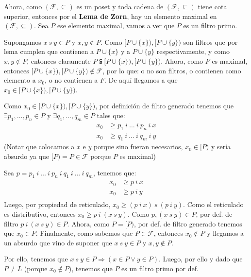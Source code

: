 \documentclass{article}
\begin{document}
Ahora, como $(\mathcal{F},\subseteq)$ es un poset y toda cadena de $(\mathcal{F},\subseteq)$ tiene cota superior, entonces por el \textbf{Lema de Zorn}, hay un elemento maximal en $(\mathcal{F},\subseteq)$. Sea $P$ ese elemento maximal, vamos a ver que $P$ es un filtro primo.

Supongamos $x\ s\ y\in P$ y $x,y\notin P$. Como $[P\cup\{x\}),[P\cup\{y\})$ son filtros que por lema cumplen que contienen a $P\cup\{x\}$ y a $P\cup\{y\}$ respectivamente, y como $x,y\notin P$, entonces claramente $P\subsetneqq [P\cup\{x\}),[P\cup\{y\})$. Ahora, como $P$ es maximal, entonces $[P\cup\{x\}),[P\cup\{y\})\notin\mathcal{F}$, por lo que: o no son filtros, o contienen como elemento a $x_0$, o no contienen a $F$. De aquí llegamos a que $x_0\in [P\cup\{x\}),[P\cup\{y\})$.

Como $x_0\in[P\cup\{x\}),[P\cup\{y\})$, por definición de filtro generado tenemos que $\exists p_1,\dots,p_n\in P$ y $\exists q_1,\dots,q_m\in P$ tales que:
\begin{equation*}
  \begin{aligned}
    x_0 & \geq p_1\ i\ \dots\ i\ p_n\ i\ x \\
    x_0 & \geq q_1\ i\ \dots\ i\ q_m\ i\ y
  \end{aligned}
\end{equation*}
(Notar que colocamos a $x$ e $y$ porque sino fueran necesarios, $x_0\in [P)$ y sería absurdo ya que $[P)=P\in\mathcal{F}$ porque $P$ es maximal)

Sea $p=p_1\ i\ \dots\ i\ p_n\ i\ q_1\ i\ \dots\ i\ q_m$, tenemos que:
\begin{equation*}
  \begin{aligned}
    x_0 & \geq p\ i\ x \\
    x_0 & \geq p\ i\ y \\
  \end{aligned}
\end{equation*}
Luego, por propiedad de reticulado, $x_0\geq (p\ i\ x)\ s\ (p\ i\ y)$. Como el reticulado es distributivo, entonces $x_0\geq p\ i\ (x\ s\ y)$. Como $p,(x\ s\ y)\in P$, por def. de filtro $p\ i\ (x\ s\ y)\in P$. Ahora, como $P=[P)$, por def. de filtro generado tenemos que $x_0\in P$. Finalmente, como sabemos que $P\in\mathcal{F}$, entonces $x_0\notin P$ y llegamos a un absurdo que vino de suponer que $x\ s\ y\in P$ y $x,y\notin P$.

Por ello, tenemos que $x\ s\ y\in P\Rightarrow(x\in P\lor y\in P)$. Luego, por ello y dado que $P\neq L$ (porque $x_0\notin P$), tenemos que $P$ es un filtro primo por def.
\end{document}
